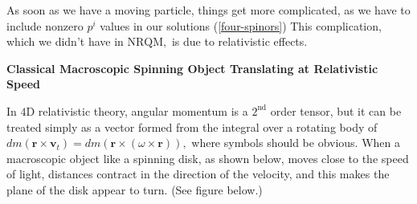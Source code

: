 As soon as we have a moving particle, things get more complicated, as we have to include nonzero $p^{i}$ values in our solutions (\ref{four-spinors}) This complication, which we didn't have in $\mathrm{NRQM},$ is due to relativistic effects.
\begin{mybox}
\textbf{Classical Macroscopic Spinning Object Translating at Relativistic Speed}

In $4 \mathrm{D}$ relativistic theory, angular momentum is a $2^{\mathrm{nd}}$ order tensor, but it can be treated simply as a vector formed from the integral over a rotating body of $d m\left(\mathbf{r} \times \mathbf{v}_{t}\right)=d m(\mathbf{r} \times(\omega \times \mathbf{r})),$ where symbols should be obvious. When a macroscopic object like a spinning disk, as shown below, moves close to the speed of light, distances contract in the direction of the velocity, and this makes the plane of the disk appear to turn. (See figure below.)
\end{mybox}

